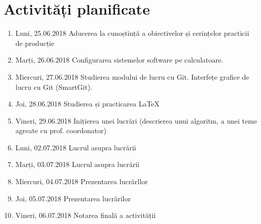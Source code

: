 \documentclass{report}
\begin{document}
\chapter{Activități planificate}
\begin{enumerate}
\item  Luni, 25.06.2018 \newline
Aducerea la cunoștință a obiectivelor și cerințelor practicii de producție
\item  Marți, 26.06.2018 \newline
Configurarea sistemelor software pe calculatoare. 
\item  Miercuri, 27.06.2018 \newline
Studierea modului de lucru cu Git. Interfețe grafice de lucru cu Git (SmartGit).
\item  Joi, 28.06.2018 \newline
Studierea și practicarea LaTeX
\item  Vineri, 29.06.2018  \newline
Inițierea unei lucrări (descrierea unui algoritm, a unei teme agreate cu prof. coordonator)
\item  Luni, 02.07.2018  \newline
Lucrul asupra lucrării
\item  Marți, 03.07.2018  \newline
Lucrul asupra lucrării
\item  Miercuri, 04.07.2018  \newline
Prezentarea lucrărllor
\item  Joi, 05.07.2018  \newline
Prezentarea lucrărilor
\item  Vineri, 06.07.2018  \newline
Notarea finală a activității
\end{enumerate}
\end{document}

